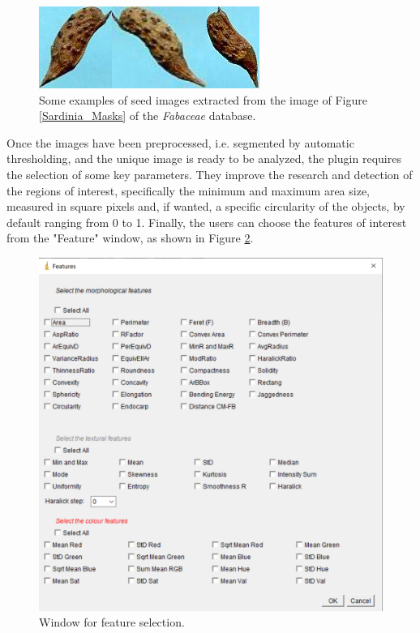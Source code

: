 \documentclass[a4paper,12pt]{article}
\begin{document}
\begin{figure}[tbp]
	\centering
	\includegraphics[scale=0.4]{Img/Sardinia_crops.png}
	\caption{Some examples of seed images extracted from the image of Figure \ref{Sardinia_Masks} of the \emph{Fabaceae} database.}
	\label{Sardinia_Crops}
\end{figure}

Once the images have been preprocessed, i.e. segmented by automatic thresholding, and the unique image is ready to be analyzed, the plugin requires the selection of some key parameters. They improve the research and detection of the regions of interest, specifically the minimum and maximum area size, measured in square pixels and, if wanted, a specific circularity of the objects, by default ranging from 0 to 1.
Finally, the users can choose the features of interest from the "Feature" window, as shown in Figure \ref{fig:features_selection}.

\begin{figure}[htbp]
\centering
\includegraphics[height=0.35\textheight]{Img/f3_features_selection.png}
\caption{\label{fig:features_selection}Window for feature selection.}
\end{figure}
\end{document}
